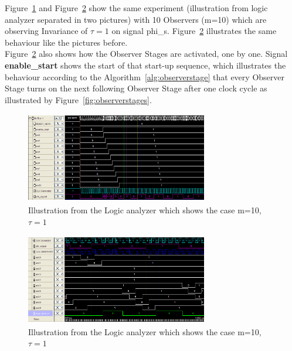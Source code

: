 Figure~\ref{fig:logicanalyzer:m10:t1:1} and Figure~\ref{fig:logicanalyzer:m10:t1:2} show the same experiment (illustration from logic analyzer separated in two pictures) 
with 10 Observers (m=10) which are observing Invariance of $\tau = 1$ on signal phi\_s. 
Figure~\ref{fig:logicanalyzer:m10:t1:2} illustrates the same behaviour like the pictures before. \\
Figure~\ref{fig:logicanalyzer:m10:t1:2} also shows how the Observer Stages are activated, one by one. 
Signal \textbf{enable\_start} shows the start of that start-up sequence, which illustrates the behaviour according to the Algorithm~\ref{alg:observerstage} that 
every Observer Stage turns on the next following Observer Stage after one clock cycle as illustrated by Figure~\ref{fig:observerstages}. \\
\begin{figure}[]
\centering
\includegraphics[width=300px,height=150px]{../../pictures/Logicanalyzer/10_Observer_Tau_1_2.png}
\caption[Logicanalyzer m=10,$\tau = 1$]{Illustration from the Logic analyzer which shows the case m=10,$\tau = 1$}
\label{fig:logicanalyzer:m10:t1:1}
\end{figure}


\begin{figure}[]
\centering
\includegraphics[width=300px,height=150px]{../../pictures/Logicanalyzer/10_Observer_Tau_1_1.png}
\caption[Logicanalyzer m=10,$\tau = 1$]{Illustration from the Logic analyzer which shows the case m=10,$\tau = 1$}
\label{fig:logicanalyzer:m10:t1:2}
\end{figure}

